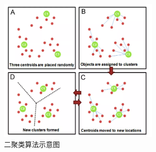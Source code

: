 \documentclass[12pt,hyperref,a4paper,UTF8]{ctexart}
\begin{document}
        \begin{figure}[H]
            \centering
            \includegraphics[width=0.7\textwidth]{./figures/fig/image13.png}
            \caption{二聚类算法示意图}
            \label{fig:kmeans_example}
        \end{figure}
\end{document}
